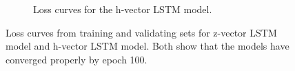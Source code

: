 \documentclass{l4proj}
\begin{document}
\begin{appendices}
\begin{figure}
\begin{subfigure}[b]{0.45\textwidth}
        \caption{Loss curves for the h-vector LSTM model.}
        \label{fig:loss_h_vec}
    \end{subfigure}
    \caption{Loss curves from training and validating sets for  z-vector LSTM model and  h-vector LSTM model. Both show that the models have converged properly by epoch 100.}
\end{figure}

\end{appendices}





\renewcommand{\thechapter}{0} 

\end{document}
